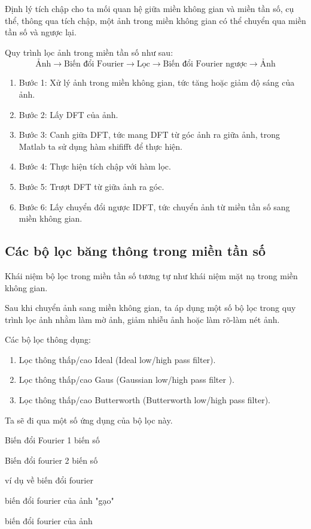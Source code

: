\documentclass[12pt,a4paper]{report}
\numberwithin{equation}{section}
\theoremstyle{definition} %
\begin{document}
Định lý tích chập cho ta mối quan hệ giữa miền không gian và miền tần số, cụ thể, thông qua tích chập, một ảnh trong miền không gian có thể chuyển qua miền tần số và ngược lại.

Quy trình lọc ảnh trong miền tần số như sau:
\[\text{Ảnh}\rightarrow\text{Biến đổi Fourier}\rightarrow\text{Lọc}\rightarrow\text{Biến đổi Fourier ngược}
\rightarrow\text{Ảnh}\]
\begin{enumerate}
\item Bước 1: Xử lý ảnh trong miền không gian, tức tăng hoặc giảm độ sáng của ảnh.
\item Bước 2: Lấy DFT của ảnh.
\item Bước 3: Canh giữa DFT, tức mang DFT từ góc ảnh ra giữa ảnh, trong Matlab ta sử dụng hàm shififft để thực hiện.
\item Bước 4: Thực hiện tích chập với hàm lọc.
\item Bước 5: Trượt DFT từ giữa ảnh ra góc.
\item Bước 6: Lấy chuyển đổi ngược IDFT, tức chuyển ảnh từ miền tần số sang miền không gian.
\end{enumerate}
\subsection{Các bộ lọc băng thông trong miền tần số}

Khái niệm bộ lọc trong miền tần số tương tự như khái niệm mặt nạ trong miền không gian.

Sau khi chuyển ảnh sang miền không gian, ta áp dụng một số bộ lọc trong quy trình lọc ảnh nhằm làm mờ ảnh, giảm nhiễu ảnh hoặc làm rõ-làm nét ảnh.

Các bộ lọc thông dụng:
\begin{enumerate}
\item Lọc thông thấp/cao Ideal (Ideal low/high pass filter).
\item Lọc thông thấp/cao Gaus (Gaussian low/high pass filter
).
\item Lọc thông thấp/cao Butterworth (Butterworth low/high pass filter).
\end{enumerate}

Ta sẽ đi qua một số ứng dụng của bộ lọc này.

Biến đổi Fourier 1 biến số

Biến đổi fourier 2 biến số

ví dụ về biến đổi fourier

biến đổi fourier của ảnh "gạo"

biến đổi fourier của ảnh
\end{document}

